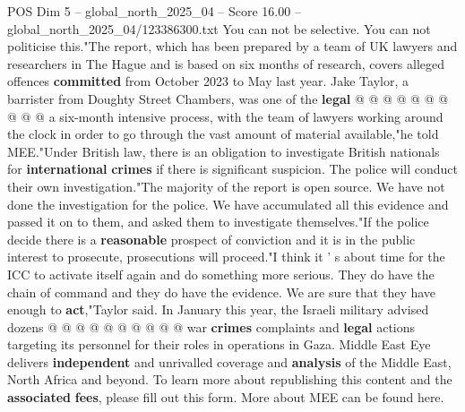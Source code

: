 \begin{textsample}{POS Dim 5 – global\_north\_2025\_04 – Score 16.00 – global\_north\_2025\_04/123386300.txt}
You can not be selective.
You can not politicise this."The report, which has been prepared by a team of UK lawyers and researchers in The Hague and is based on six months of research, covers alleged offences \textbf{committed} from October 2023 to May last year.
Jake Taylor, a barrister from Doughty Street Chambers, was one of the \textbf{legal} @ @ @ @ @ @ @ @ @ @ a six-month intensive process, with the team of lawyers working around the clock in order to go through the vast amount of material available,"he told MEE."Under British law, there is an obligation to investigate British nationals for \textbf{international} \textbf{crimes} if there is significant suspicion.
The police will conduct their own investigation."The majority of the report is open source.
We have not done the investigation for the police.
We have accumulated all this evidence and passed it on to them, and asked them to investigate themselves."If the police decide there is a \textbf{reasonable} prospect of conviction and it is in the public interest to prosecute, prosecutions will proceed."I think it ' s about time for the ICC to activate itself again and do something more serious.
They do have the chain of command and they do have the evidence.
We are sure that they have enough to \textbf{act},"Taylor said.
In January this year, the Israeli military advised dozens @ @ @ @ @ @ @ @ @ @ war \textbf{crimes} complaints and \textbf{legal} actions targeting its personnel for their roles in operations in Gaza.
Middle East Eye delivers \textbf{independent} and unrivalled coverage and \textbf{analysis} of the Middle East, North Africa and beyond.
To learn more about republishing this content and the \textbf{associated} \textbf{fees}, please fill out this form.
More about MEE can be found here.

\end{textsample}
